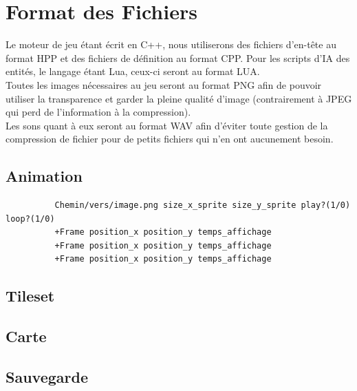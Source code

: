 \documentclass[a4paper]{article}
\newcommand{\alinea}{\hspace*{0.5cm}}
\begin{document}
    \section{Format des Fichiers}
      \alinea Le moteur de jeu étant écrit en C++, nous utiliserons des fichiers d'en-tête au format HPP et des fichiers de définition au format CPP. Pour les scripts d'IA des entités, le langage étant Lua, ceux-ci seront au format LUA.\\
      \alinea Toutes les images nécessaires au jeu seront au format PNG afin de pouvoir utiliser la transparence et garder la pleine qualité d'image (contrairement à JPEG qui perd de l'information à la compression).\\
      \alinea Les sons quant à eux seront au format WAV afin d'éviter toute gestion de la compression de fichier pour de petits fichiers qui n'en ont aucunement besoin.

      \subsection{Animation}
        \begin{verbatim}
          Chemin/vers/image.png size_x_sprite size_y_sprite play?(1/0) loop?(1/0)
          +Frame position_x position_y temps_affichage
          +Frame position_x position_y temps_affichage
          +Frame position_x position_y temps_affichage
        \end{verbatim}
      
      \subsection{Tileset}
      
      \subsection{Carte}
      
      \subsection{Sauvegarde}
      
\end{document}
